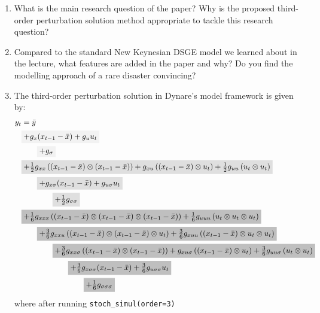 \documentclass{article}
\begin{document}
\begin{enumerate}
\item
What is the main research question of the paper?
Why is the proposed third-order perturbation solution method appropriate to tackle this research question?

\item
Compared to the standard New Keynesian DSGE model we learned about in the lecture,
  what features are added in the paper and why? Do you find the modelling approach of a rare disaster convincing?

\item
The third-order perturbation solution in Dynare's model framework is given by:
\begin{align*}
y_t &= \bar{y}\\
&
\colorbox{gray!10}{\(%
+g_x (x_{t-1} - \bar{x}) + g_u u_{t}
\)}
\\
&
\qquad
\colorbox{gray!10}{\(%
+ g_{\sigma}
\)}
\\
&
\colorbox{gray!25}{\(%
+ \frac{1}{2} g_{xx} \left((x_{t-1} - \bar{x}) \otimes (x_{t-1} - \bar{x})\right)
  +           g_{xu} \left((x_{t-1} - \bar{x}) \otimes u_t\right)
+ \frac{1}{2} g_{uu} \left(u_t \otimes u_t\right)
\)}
\\
&
\qquad
\colorbox{gray!25}{\(%
+ g_{x\sigma} (x_{t-1} - \bar{x})
+ g_{u\sigma} u_t
\)}
\\
&
\qquad\qquad
\colorbox{gray!25}{\(%
+ \frac{1}{2} g_{\sigma\sigma}
\)}
\\
&
\colorbox{gray!50}{\(%
  + \frac{1}{6} g_{xxx} \left((x_{t-1} - \bar{x}) \otimes (x_{t-1} - \bar{x}) \otimes (x_{t-1} - \bar{x})\right)
  + \frac{1}{6} g_{uuu} \left(u_t \otimes u_t \otimes u_t\right)
\)}
\\
&
\qquad
\colorbox{gray!50}{\(%
+ \frac{3}{6} g_{xxu} \left((x_{t-1} - \bar{x}) \otimes (x_{t-1} - \bar{x}) \otimes u_t \right)
+ \frac{3}{6} g_{xuu} \left((x_{t-1} - \bar{x}) \otimes u_t \otimes u_t \right)
\)}
\\
&
\qquad\qquad
\colorbox{gray!50}{\(%
  + \frac{3}{6} g_{xx\sigma} \left((x_{t-1} - \bar{x}) \otimes (x_{t-1} - \bar{x}) \right)
  +             g_{xu\sigma} \left((x_{t-1} - \bar{x}) \otimes u_t \right)
+ \frac{3}{6} g_{uu\sigma} \left(u_t \otimes u_t \right)
\)}
\\
&
\qquad\qquad\qquad
\colorbox{gray!50}{\(%
  + \frac{3}{6} g_{x\sigma\sigma} (x_{t-1} - \bar{x})
  + \frac{3}{6} g_{u\sigma\sigma} u_t
\)}
\\
&
\qquad\qquad\qquad\qquad
\colorbox{gray!50}{\(
  + \frac{1}{6} g_{\sigma\sigma\sigma}
\)}
\end{align*}
where after running \texttt{stoch\_simul{(order=3)}}


\end{enumerate}
\end{document}
